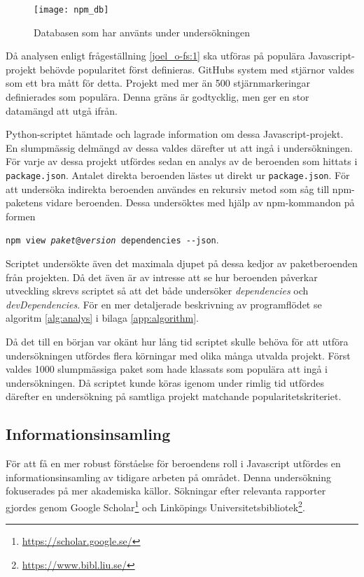 \begin{figure}[ht]
  \centering
  \texttt{[image: npm\_db]}
  \caption{Databasen som har använts under undersökningen}
  \label{fig:dependency-db}
\end{figure}

Då analysen enligt frågeställning \ref{joel_o-fs:1} ska utföras på populära Javascript-projekt behövde popularitet först definieras. GitHubs system med stjärnor valdes som ett bra mått för detta. Projekt med mer än 500 stjärnmarkeringar definierades som populära. Denna gräns är godtycklig, men ger en stor datamängd att utgå ifrån.

Python-scriptet hämtade och lagrade information om dessa Javascript-projekt. En slumpmässig delmängd av dessa valdes därefter ut att ingå i undersökningen. För varje av dessa projekt utfördes sedan en analys av de beroenden som hittats i \texttt{package.json}. Antalet direkta beroenden lästes ut direkt ur \texttt{package.json}. För att undersöka indirekta beroenden användes en rekursiv metod som såg till npm-paketens vidare beroenden. Dessa undersöktes med hjälp av npm-kommandon på formen

\begin{center}
  \texttt{npm view \textit{paket}@\textit{version} dependencies \hyphen\hyphen json}.
\end{center}

Scriptet undersökte även det maximala djupet på dessa kedjor av paketberoenden från projekten. Då det även är av intresse att se hur beroenden påverkar utveckling skrevs scriptet så att det både undersöker \textit{dependencies} och \textit{devDependencies}. För en mer detaljerade beskrivning av programflödet se algoritm \ref{alg:analys} i bilaga \ref{app:algorithm}.

Då det till en början var okänt hur lång tid scriptet skulle behöva för att utföra undersökningen utfördes flera körningar med olika många utvalda projekt. Först valdes 1000 slumpmässiga paket som hade klassats som populära att ingå i undersökningen. Då scriptet kunde köras igenom under rimlig tid utfördes därefter en undersökning på samtliga projekt matchande popularitetskriteriet.

\subsection{Informationsinsamling}
För att få en mer robust förståelse för beroendens roll i Javascript utfördes en informationsinsamling av tidigare arbeten på området. Denna undersökning fokuserades på mer akademiska källor. Sökningar efter relevanta rapporter gjordes genom Google Scholar\footnote{\url{https://scholar.google.se/}} och Linköpings Universitetsbibliotek\footnote{\url{https://www.bibl.liu.se/}}.

